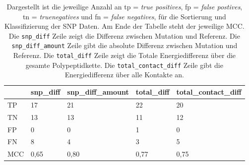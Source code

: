 \begin{table}[]
    \centering
    \caption{Dargestellt ist die jeweilige Anzahl an tp = \emph{true positives}, fp = \emph{false postives}, tn = \emph{truenegatives} und fn = \emph{false negatives}, für die Sortierung und Klassifizierung der \ac{SNP} Daten. Am Ende der Tabelle steht der jeweilige \acf{MCC}. Die \texttt{snp\_diff} Zeile zeigt die Differenz zwischen Mutation und Referenz. Die \texttt{snp\_diff\_amount} Zeile gibt die absolute Differenz zwischen Mutation und Referenz. Die \texttt{total\_diff} Zeile zeigt die Totale Energiedifferenz über die gesamte Polypeptidkette. Die \texttt{total\_contact\_diff} Zeile gibt die Energiedifferenz über alle Kontakte an.}
    \label{tab:mcc_table}
    \begin{tabular}{l|l|l|l|l|}
        \cline{2-5}
         & snp\_diff & snp\_diff\_amount & total\_diff & total\_contact\_diff \\ \hline
        \multicolumn{1}{|l|}{TP} & 17 & 21 & 22 & 20 \\ \hline
        \multicolumn{1}{|l|}{TN} & 13 & 13 & 11 & 12 \\ \hline
        \multicolumn{1}{|l|}{FP} & 0 & 0 & 1 & 0 \\ \hline
        \multicolumn{1}{|l|}{FN} & 8 & 4 & 3 & 5 \\ \hline
        \multicolumn{1}{|l|}{MCC} & \cellcolor[HTML]{FFFFC7}0,65 & \cellcolor[HTML]{9AFF99}0,80 & \cellcolor[HTML]{CBFFCB}0,77 & \cellcolor[HTML]{E2FFE2}0,75 \\ \hline
    \end{tabular}
\end{table}








